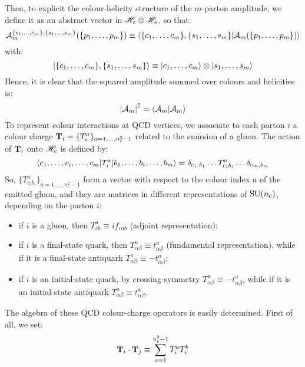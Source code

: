 Then, to explicit the colour-helicity structure of the $ m $-parton amplitude, we define it as an abstract vector in $ \mathscr{H}_c \otimes \mathscr{H}_s $, so that:
\begin{equation}
  \mathcal{A}_m^{\{c_1, \dots, c_m\}, \{s_1, \dots, s_m\}}(\{p_1, \dots, p_m\}) \equiv \braket{\{c_1, \dots, c_m\}, \{s_1, \dots, s_m\} | \mathcal{A}_m(\{p_1, \dots, p_m\})}
\end{equation}
with:
\begin{equation*}
  \ket{\{c_1, \dots, c_m\}, \{s_1, \dots, s_m\}} \equiv \ket{c_1, \dots, c_m} \otimes \ket{s_1, \dots, s_m}
\end{equation*}
Hence, it is clear that the squared amplitude summed over colours and helicities is:
\begin{equation}
  \left\lvert\mathcal{A}_m\right\rvert^2 = \braket{\mathcal{A}_m | \mathcal{A}_m}
\end{equation}
To represent colour interactions at QCD vertices, we associate to each parton $ i $ a colour charge $ \mathbf{T}_i = \{T_i^a\}_{a = 1, \dots, n_c^2 - 1} $ related to the emission of a gluon. The action of $ \mathbf{T}_i $ onto $ \mathscr{H}_c $ is defined by:
\begin{equation}
  \braket{c_1, \dots, c_i, \dots, c_m | T_i^a | b_1, \dots, b_i, \dots, b_m} = \delta_{c_1, b_1} \dots T^a_{c_i b_i} \dots \delta_{c_m, b_m}
  \label{eq:t-act}
\end{equation}
So, $ \{T^a_{c_i b_i}\}_{a = 1, \dots, n_c^2 - 1} $ form a vector with respect to the colour index $ a $ of the emitted gluon, and they are matrices in different representations of $ \mathrm{SU}(n_c) $, depending on the parton $ i $:
\begin{itemize}
  \item if $ i $ is a gluon, then $ T^a_{cb} \equiv i f_{cab} $ (adjoint representation);
  \item if $ i $ is a final-state quark, then $ T^a_{\alpha \beta} \equiv t^a_{\alpha \beta} $ (fundamental representation), while if it is a final-state antiquark $ T^a_{\alpha \beta} \equiv - t^a_{\alpha \beta} $;
  \item if $ i $ is an initial-state quark, by crossing-symmetry $ T^a_{\alpha \beta} \equiv - t^a_{\alpha \beta}$, while if it is an initial-state antiquark $ T^a_{\alpha \beta} \equiv t^a_{\alpha \beta} $.
\end{itemize}
The algebra of these QCD colour-charge operators is easily determined. First of all, we set:
\begin{equation}
  \mathbf{T}_i \cdot \mathbf{T}_j \equiv \sum_{a = 1}^{n_c^2 - 1} T_i^a T_i^b
  \label{eq:t-dot}
\end{equation}
